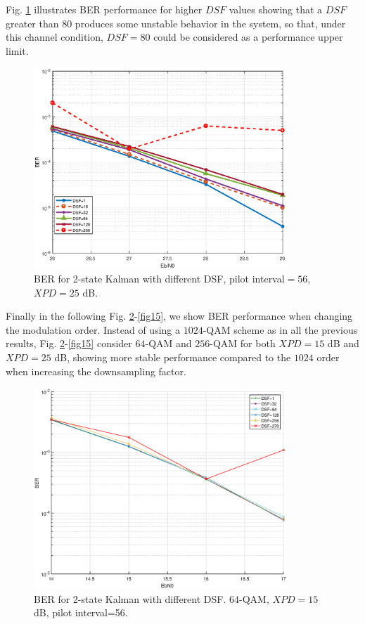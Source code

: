 Fig. \ref{fig11} illustrates BER performance for higher $DSF$ values showing that a $DSF$ greater than $80$ produces some unstable behavior in the system, so that, under this channel condition, $DSF=80$ could be considered as a performance upper limit.

\begin{figure}
	\includegraphics[width=0.85\textwidth]{figures/fig_red_kalman/fig11.eps}
	\caption{BER for 2-state Kalman with different DSF, pilot interval$=56$, $XPD=25$ dB.}
	\label{fig11}      
\end{figure}

Finally in the following Fig. \ref{fig12}-\ref{fig15}, we show BER performance when changing the modulation order. Instead of using a $1024$-QAM scheme as in all the previous results, Fig. \ref{fig12}-\ref{fig15} consider $64$-QAM and $256$-QAM for both $XPD=15$ dB and $XPD=25$ dB, showing more stable performance compared to the $1024$ order when increasing the downsampling factor. 

\begin{figure}
	\includegraphics[width=0.85\textwidth]{figures/fig_red_kalman/xpic_xpd_15_qam_64_bis.eps}
	\caption{BER for 2-state Kalman with different DSF. $64$-QAM, $XPD=15$ dB, pilot interval=56.}
	\label{fig12}      
\end{figure}

